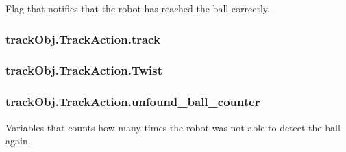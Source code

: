 Flag that notifies that the robot has reached the ball correctly. 

\subsubsection[{\texorpdfstring{track}{track}}]{\setlength{\rightskip}{0pt plus 5cm}track\+Obj.\+Track\+Action.\+track\hspace{0.3cm}{\ttfamily [static]}}\hypertarget{classtrackObj_1_1TrackAction_a5541788941fcebbf14c41f71aad8613b}{}\label{classtrackObj_1_1TrackAction_a5541788941fcebbf14c41f71aad8613b}
\subsubsection[{\texorpdfstring{Twist}{Twist}}]{\setlength{\rightskip}{0pt plus 5cm}track\+Obj.\+Track\+Action.\+Twist\hspace{0.3cm}{\ttfamily [static]}}\hypertarget{classtrackObj_1_1TrackAction_a0b3d5b465c4212747cc29a6c478a81eb}{}\label{classtrackObj_1_1TrackAction_a0b3d5b465c4212747cc29a6c478a81eb}
\subsubsection[{\texorpdfstring{unfound\+\_\+ball\+\_\+counter}{unfound_ball_counter}}]{\setlength{\rightskip}{0pt plus 5cm}track\+Obj.\+Track\+Action.\+unfound\+\_\+ball\+\_\+counter\hspace{0.3cm}{\ttfamily [static]}}\hypertarget{classtrackObj_1_1TrackAction_afd86c34cad32d9ade931346be52cccf5}{}\label{classtrackObj_1_1TrackAction_afd86c34cad32d9ade931346be52cccf5}


Variables that counts how many times the robot was not able to detect the ball again. 

